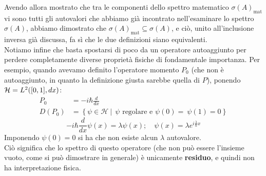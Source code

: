 \documentclass[../../FisicaTeorica.tex]{subfiles}
\begin{document}
Avendo allora mostrato che tra le componenti dello spettro matematico $\sigma(A)_{\text{mat}}$ vi sono tutti gli autovalori che abbiamo già incontrato nell'esaminare lo spettro $\sigma(A)$, abbiamo dimostrato che $\sigma(A)_{\text{mat}} \subseteq \sigma(A)$, e ciò, unito all'inclusione inversa già discussa, fa sì che le due definizioni siano equivalenti.\\
Notiamo infine che basta spostarsi di poco da un operatore autoaggiunto per perdere completamente diverse proprietà fisiche di fondamentale importanza. Per esempio, quando avevamo definito l'operatore momento $P_0$ (che non è autoaggiunto, in quanto la definizione giusta sarebbe quella di $P$), ponendo $\mathcal{H} = L^2([0,1],dx)$:
\begin{align*}
P_0&=-i\hbar \frac{d}{dx}\\
D\left(P_0\right)&=\left\{\psi\in\mathcal{H}\ |\ \ \psi\text{ regolare e } \psi\left(0\right)=\ \psi\left(1\right)=0\right\}
\end{align*}
\[
-i\hbar \frac{d}{dx}\psi(x) = \lambda \psi(x); \quad \psi(x) = \lambda e^{i\frac{\lambda}{\hbar}x}
\]
Imponendo $\psi \left(0\right)=0$ si ha che non esiste alcun $\lambda$ autovalore.\\ Ciò significa che lo spettro di questo operatore (che non può essere l'insieme vuoto, come si può dimostrare in generale) è unicamente \textbf{residuo}, e quindi non ha interpretazione fisica.
\end{document}
